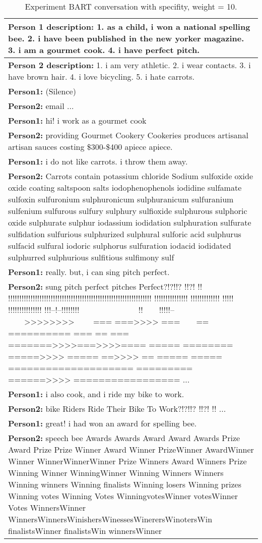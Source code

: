 \begin{table}[H]
\centering
 \begin{tabular}{|p{14cm}|} 
 \hline
 \textbf{Person 1 description:} 1. as a child, i won a national spelling bee. 2. i have been published in the new yorker magazine. 3. i am a gourmet cook. 4. i have perfect pitch. \\
 \hline
 \textbf{Person 2 description:} 1. i am very athletic. 2. i wear contacts. 3. i have brown hair. 4. i love bicycling. 5. i hate carrots. \\
 \hline
 \textbf{Person1:} (Silence) \\
 \textbf{Person2:} email ...\\ 
 \textbf{Person1:} hi! i work as a gourmet cook \\
 \textbf{Person2:} providing Gourmet Cookery Cookeries produces artisanal artisan sauces costing \$300-\$400 apiece apiece.\\
 \textbf{Person1:} i do not like carrots. i throw them away. \\
 \textbf{Person2:} Carrots contain potassium chloride Sodium sulfoxide oxide oxide coating saltspoon salts iodophenophenols iodidine sulfamate sulfoxin sulfuronium sulphuronicum sulphuranicum sulfuranium sulfenium sulfurous sulfury sulphury sulfioxide sulphurous sulphoric oxide sulphurate sulphur iodassium iodidation sulphuration sulfurate sulfidation sulfurious sulphurized sulphural sulforic acid sulphurus sulfacid sulfural iodoric sulphorus sulfuration iodacid iodidated sulphurred sulphurious sulfitious sulfimony sulf \\
 \textbf{Person1:} really. but, i can sing pitch perfect. \\
 \textbf{Person2:} sung pitch perfect pitches Perfect?!?!!? !!?! !! !!!!!!!!!!!!!!!!!!!!!!!!!!!!!!!!!!!!!!!!!!!!!!!!!!!!!!!!!!!!!!!! !!!!!!!!!!!!!!! !!!!!!!!!!!!! !!!!! !!!!!!!!!!!!!!! !!!--!--!!!!!!!!~~~~~~~~~~~~~~ !!~~~~!!!!!--~~~~>>>>>>>>~~~~ === ===>>>> ===~~~~== ========== === == === =======>>>>===>>>>==== ===== ======== =====>>>> ===== ==>>>> == ===== ===== ==================== ========= ======>>>> ================= ...\\
 \textbf{Person1:} i also cook, and i ride my bike to work. \\
 \textbf{Person2:} bike Riders Ride Their Bike To Work?!?!!? !!?! !! ... \\
 \textbf{Person1:} great! i had won an award for spelling bee. \\
 \textbf{Person2:} speech bee Awards Awards Award Award Awards Prize Award Prize Prize Winner Award Winner PrizeWinner AwardWinner Winner WinnerWinnerWinner Prize Winners Award Winners Prize Winning Winner WinningWinner Winning Winners Winners Winning winners Winning finalists Winning losers Winning prizes Winning votes Winning Votes WinningvotesWinner votesWinner Votes WinnersWinner WinnersWinnersWinishersWinessesWinerersWinotersWin finalistsWinner finalistsWin winnersWinner \\
 \hline
 \end{tabular}
 \caption{Experiment BART conversation with specifity, weight = 10.}
\label{tab:bart_conversation_idf10_ap}
\end{table}



